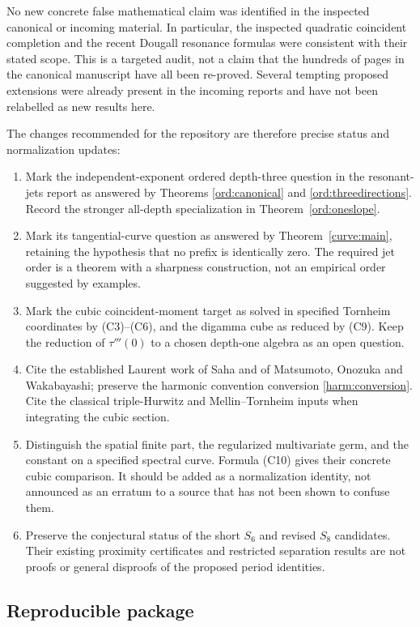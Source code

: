 No new concrete false mathematical claim was identified in the
inspected canonical or incoming material. In particular, the inspected
quadratic coincident completion and the recent Dougall resonance
formulas were consistent with their stated scope. This is a targeted
audit, not a claim that the hundreds of pages in the canonical
manuscript have all been re-proved. Several tempting proposed
extensions were already present in the incoming reports and have not
been relabelled as new results here.

The changes recommended for the repository are therefore precise
status and normalization updates:
\begin{enumerate}[leftmargin=*,itemsep=4pt]
\item Mark the independent-exponent ordered depth-three question in
the resonant-jets report as answered by Theorems
\ref{ord:canonical} and \ref{ord:threedirections}. Record the stronger
all-depth specialization in Theorem~\ref{ord:oneslope}.
\item Mark its tangential-curve question as answered by
Theorem~\ref{curve:main}, retaining the hypothesis that no prefix is
identically zero. The required jet order is a theorem with a sharpness
construction, not an empirical order suggested by examples.
\item Mark the cubic coincident-moment target as solved in specified
Tornheim coordinates by (C3)--(C6), and the digamma cube as reduced by
(C9). Keep the reduction of $\tau'''(0)$ to a chosen depth-one algebra
as an open question.
\item Cite the established Laurent work of Saha and of Matsumoto,
Onozuka and Wakabayashi; preserve the harmonic convention conversion
\eqref{harm:conversion}. Cite the classical triple-Hurwitz and
Mellin--Tornheim inputs when integrating the cubic section.
\item Distinguish the spatial finite part, the regularized
multivariate germ, and the constant on a specified spectral curve.
Formula (C10) gives their concrete cubic comparison. It should be
added as a normalization identity, not announced as an erratum to a
source that has not been shown to confuse them.
\item Preserve the conjectural status of the short $S_6$ and revised
$S_8$ candidates. Their existing proximity certificates and restricted
separation results are not proofs or general disproofs of the proposed
period identities.
\end{enumerate}

\subsection{Reproducible package}

